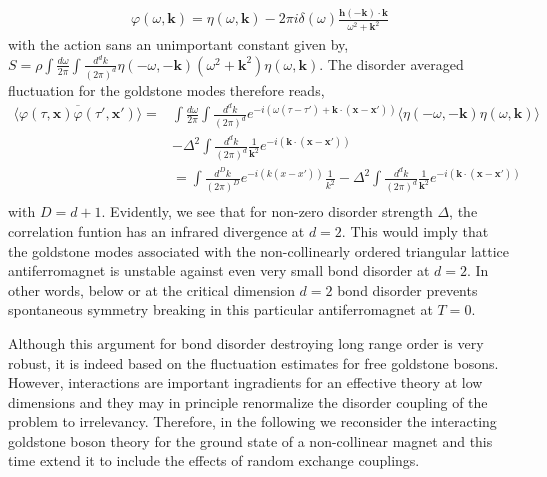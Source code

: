 \documentclass[notitlepage,onecolumn,showpacs,11pt]{revtex4-1}
\newcommand{\mbf}[1]{\mathbf{#1}}
\begin{document}
\begin{equation}
    \begin{aligned}
        \varphi(\omega,\mbf{k})=\eta(\omega,\mbf{k})-
        2\pi i\delta(\omega)\frac{\mbf{h}(-\mbf{k})\cdot\mbf{k}}{\omega^2+\mbf{k}^2}
    \end{aligned}
\end{equation}
with the action sans an unimportant constant given by, $S =\rho\int \frac{d\omega}{2\pi}
\int \frac{d^dk}{(2\pi)^d}\eta(-\omega,-\mbf{k})\left(\omega^2+\mbf{k}^2\right)
\eta(\omega,\mbf{k})$. The disorder averaged fluctuation for the goldstone modes therefore
reads,
\begin{equation}
    \begin{aligned}
        \overline{\langle\varphi(\tau,\mbf{x})\varphi(\tau',\mbf{x}')\rangle}
        =&\int \frac{d\omega}{2\pi}\int \frac{d^dk}{(2\pi)^d}
        e^{-i\left(\omega(\tau-\tau')+\mbf{k}\cdot(\mbf{x}-\mbf{x}')\right)}
        \langle\eta(-\omega,-\mbf{k})\eta(\omega,\mbf{k})\rangle \\
        &-\Delta^2\int \frac{d^dk}{(2\pi)^d}\frac{1}{\mbf{k}^2}
        e^{-i\left(\mbf{k}\cdot(\mbf{x}-\mbf{x}')\right)}\\
        &=\int \frac{d^Dk}{(2\pi)^D}
        e^{-i\left(k(x-x')\right)}
        \frac{1}{k^2}-\Delta^2\int \frac{d^dk}{(2\pi)^d}\frac{1}{\mbf{k}^2}
        e^{-i\left(\mbf{k}\cdot(\mbf{x}-\mbf{x}')\right)}\\
    \end{aligned}
\end{equation}
with $D=d+1$. Evidently, we see that for non-zero disorder strength $\Delta$, the correlation
funtion has an infrared divergence at $d=2$. This would imply that the goldstone 
modes associated with the non-collinearly ordered triangular lattice antiferromagnet is 
unstable against even very small bond disorder at $d = 2$. In other words, below or at the
critical dimension $d=2$ bond disorder prevents spontaneous symmetry breaking in this
particular antiferromagnet at $T=0$.

Although this argument for bond disorder destroying long range order is very robust, it is 
indeed based on the fluctuation estimates for free goldstone bosons. However, interactions
are important ingradients for an effective theory at low dimensions and they may in 
principle renormalize the disorder coupling of the problem to irrelevancy. Therefore, in 
the following we reconsider the interacting goldstone boson theory for the ground state
of a non-collinear magnet and this time extend it to include the effects of random
exchange couplings.
\end{document}
